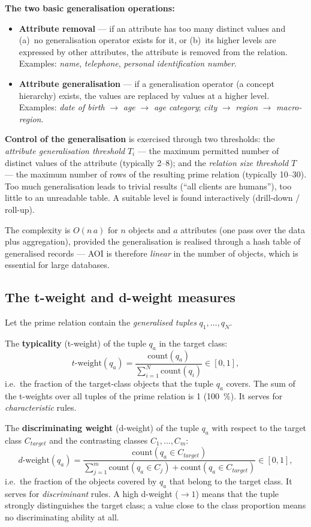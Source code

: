 \documentclass[11pt,a4paper]{article}
\theoremstyle{definition}
\providecommand{\uv}[1]{``#1''}
\begin{document}
\textbf{The two basic generalisation operations:}
\begin{itemize}
\item \textbf{Attribute removal} --- if an attribute has too many distinct values and (a)~no
      generalisation operator exists for it, or (b)~its higher levels are expressed by other
      attributes, the attribute is removed from the relation. Examples: \emph{name},
      \emph{telephone}, \emph{personal identification number}.
\item \textbf{Attribute generalisation} --- if a generalisation operator (a concept hierarchy)
      exists, the values are replaced by values at a higher level. Examples: \emph{date of birth}
      $\to$ \emph{age} $\to$ \emph{age category}; \emph{city} $\to$ \emph{region} $\to$
      \emph{macro-region}.
\end{itemize}

\textbf{Control of the generalisation} is exercised through two thresholds: the
\emph{attribute generalisation threshold} $T_i$ --- the maximum permitted number of distinct values
of the attribute (typically 2--8); and the \emph{relation size threshold} $T$ --- the maximum
number of rows of the resulting prime relation (typically 10--30). Too much generalisation leads to
trivial results (\uv{all clients are humans}), too little to an unreadable table. A suitable level
is found interactively (drill-down / roll-up).

The complexity is $O(n\,a)$ for $n$ objects and $a$ attributes (one pass over the data plus
aggregation), provided the generalisation is realised through a hash table of generalised records
--- AOI is therefore \emph{linear} in the number of objects, which is essential for large
databases.

\subsection{The t-weight and d-weight measures}

\begin{defbox}
Let the prime relation contain the \emph{generalised tuples} $q_1,\dots,q_N$.

The \textbf{typicality} (t-weight) of the tuple $q_a$ in the target class:
\[ t\text{-}\mathrm{weight}(q_a)=\frac{\mathrm{count}(q_a)}{\sum_{i=1}^{N}\mathrm{count}(q_i)}
   \in[0,1], \]
i.e.\ the fraction of the target-class objects that the tuple $q_a$ covers. The sum of the
t-weights over all tuples of the prime relation is 1 (100~\%). It serves for
\emph{characteristic} rules.

The \textbf{discriminating weight} (d-weight) of the tuple $q_a$ with respect to the target class
$C_{target}$ and the contrasting classes $C_1,\dots,C_m$:
\[ d\text{-}\mathrm{weight}(q_a)=\frac{\mathrm{count}(q_a\in C_{target})}
   {\sum_{j=1}^{m}\mathrm{count}(q_a\in C_j)+\mathrm{count}(q_a\in C_{target})}\in[0,1], \]
i.e.\ the fraction of the objects covered by $q_a$ that belong to the target class. It serves for
\emph{discriminant} rules. A high d-weight ($\to 1$) means that the tuple strongly distinguishes
the target class; a value close to the class proportion means no discriminating ability at all.
\end{defbox}
\end{document}
